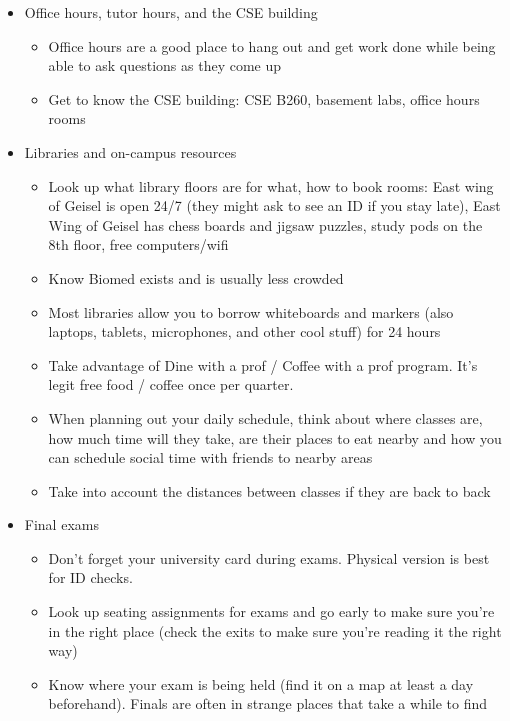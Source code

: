 \begin{itemize}
\begin{itemize}
\end{itemize}
\item Office hours, tutor hours, and the CSE building
\begin{itemize}
\item Office hours are a good place to hang out and get work done while being able to ask questions as they come up 
\item Get to know the CSE building: CSE B260, basement labs, office hours rooms
\end{itemize}
\item Libraries and on-campus resources
\begin{itemize}
\item Look up what library floors are for what, how to book rooms: East wing of Geisel is open 24/7 (they might ask to see an ID if you stay late), East Wing of Geisel has chess boards and jigsaw puzzles, study pods on the 8th floor, 
free computers/wifi
\item Know Biomed exists and is usually less crowded
\item Most libraries allow you to borrow whiteboards and markers (also laptops, tablets, microphones, and other cool stuff) for 24 hours
\item Take advantage of Dine with a prof / Coffee with a prof program. It's legit free food / coffee once per quarter. 
\item When planning out your daily schedule, think about where classes are, how much time will they take, are their places to eat nearby and how you can schedule social time with friends to nearby areas 
\item Take into account the distances between classes if they are back to back
\end{itemize} 
\newpage
\item Final exams
\begin{itemize}
\item Don't forget your university card during exams. Physical version is best for ID checks.
\item Look up seating assignments for exams and go early to make sure you're in the right place (check the exits to make sure you're reading it the right way) 
\item Know where your exam is being held (find it on a map at least a day beforehand). Finals are often in strange places that take a while to find 
\end{itemize}
\end{itemize}

